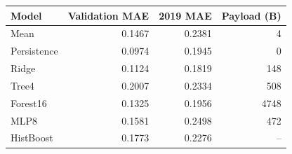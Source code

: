 \begin{tabular}{lrrr}
\toprule
Model & Validation MAE & 2019 MAE & Payload (B) \\
\midrule
Mean & 0.1467 & 0.2381 & 4 \\
Persistence & 0.0974 & 0.1945 & 0 \\
Ridge & 0.1124 & 0.1819 & 148 \\
Tree4 & 0.2007 & 0.2334 & 508 \\
Forest16 & 0.1325 & 0.1956 & 4748 \\
MLP8 & 0.1581 & 0.2498 & 472 \\
HistBoost & 0.1773 & 0.2276 & -- \\
\bottomrule
\end{tabular}
